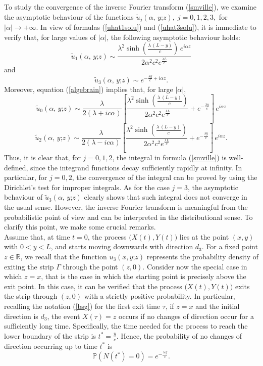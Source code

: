 \documentclass{article}
\renewcommand{\sinh}{\operatorname{sinh}}
\begin{document}
\noindent To study the convergence of the inverse Fourier transform (\ref{smville}), we examine the asymptotic behaviour of the functions $\widetilde{u}_j(\alpha,\,y\mathord{;}z),\;j=0,1,2,3,$ for $\lvert\alpha\lvert\to+\infty$. In view of formulas (\ref{uhat1solu}) and (\ref{uhat3solu}), it is immediate to verify that, for large values of $\lvert\alpha\lvert$, the following asymptotic behaviour holds:
$$\widetilde{u}_1(\alpha,\,y\mathord{;}z)\sim\frac{\lambda^2\sinh\left(\frac{\lambda\,(L-y)}{c}\right)\,e^{i\alpha z}}{2\alpha^2 c^2 e^{\frac{\lambda L}{c}}}$$
and
\begin{equation}\widetilde{u}_3(\alpha,\,y\mathord{;}z)\sim e^{-\frac{\lambda y}{c}+i\alpha z}.\label{asym3}\end{equation}
Moreover, equation (\ref{algebrain}) implies that, for large $\lvert\alpha\lvert$,
$$\widetilde{u}_0(\alpha,\,y\mathord{;}z)\sim\frac{\lambda}{2(\lambda+ic\alpha)}\left[\frac{\lambda^2\sinh\left(\frac{\lambda\,(L-y)}{c}\right)}{2\alpha^2 c^2 e^{\frac{\lambda L}{c}}}+e^{-\frac{\lambda y}{c}}\right]\,e^{i\alpha z}$$
$$\widetilde{u}_2(\alpha,\,y\mathord{;}z)\sim\frac{\lambda}{2(\lambda-ic\alpha)}\left[\frac{\lambda^2\sinh\left(\frac{\lambda\,(L-y)}{c}\right)}{2\alpha^2 c^2 e^{\frac{\lambda L}{c}}}+e^{-\frac{\lambda y}{c}}\right]\,e^{i\alpha z}.$$
Thus, it is clear that, for $j=0,1,2$, the integral in formula (\ref{smville}) is well-defined, since the integrand functions decay sufficiently rapidly at infinity. In particular, for $j=0,2$, the convergence of the integral can be proved by using the Dirichlet's test for improper integrals. As for the case $j=3$, the asymptotic behaviour of $\widetilde{u}_3(\alpha,\,y\mathord{;}z)$ clearly shows that such integral does not converge in the usual sense. However, the inverse Fourier transform is meaningful from the probabilistic point of view and can be interpreted in the distributional sense. To clarify this point, we make some crucial remarks.\\
Assume that, at time $t=0$, the process $\big(X(t),Y(t)\big)$ lies at the point $(x,y)$ with $0<y<L$, and starts moving downwards with direction $d_3$. For a fixed point $z\in\mathbb{R}$, we recall that the function $u_3(x,y\mathord{;}z)$ represents the probability density of exiting the strip $\Gamma$ through the point $(z,0)$. Consider now the special case in which $z=x$, that is the case in which the starting point is precisely above the exit point. In this case, it can be verified that the process $\big(X(t),Y(t)\big)$ exits the strip through $(z,0)$ with a strictly positive probability. In particular, recalling the notation (\ref{bsg}) for the first exit time $\tau$, if $z=x$ and the initial direction is $d_3$, the event $X(\tau)=z$ occurs if no changes of direction occur for a sufficiently long time. Specifically, the time needed for the process to reach the lower boundary of the strip is $t^*=\frac{y}{c}$. Hence, the probability of no changes of direction occurring up to time $t^*$ is $$\mathbb{P}\left(N(t^*)=0\right)=e^{-\frac{\lambda\,y}{c}}.$$
\end{document}
